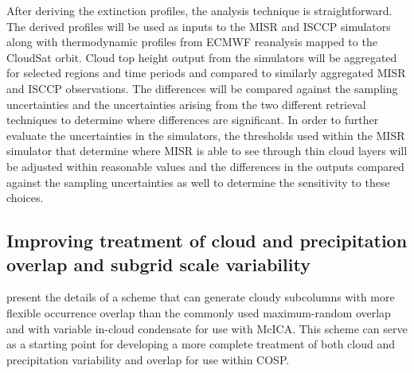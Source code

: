 \documentclass[letter]{article}
\begin{document}
After deriving the extinction profiles, the analysis technique is straightforward. The derived profiles will be used as inputs to the MISR and ISCCP simulators along with thermodynamic profiles from ECMWF reanalysis mapped to the CloudSat orbit. Cloud top height output from the simulators will be aggregated for selected regions and time periods and compared to similarly aggregated MISR and ISCCP observations. The differences will be compared against the sampling uncertainties and the uncertainties arising from the two different retrieval techniques to determine where differences are significant. In order to further evaluate the uncertainties in the simulators, the thresholds used within the MISR simulator that determine where MISR is able to see through thin cloud layers will be adjusted within reasonable values and the differences in the outputs compared against the sampling uncertainties as well to determine the sensitivity to these choices.


\subsection{Improving treatment of cloud and precipitation overlap and subgrid scale variability}
\cite{raisanen_et_al_2004} present the details of a scheme that can generate cloudy subcolumns with more flexible occurrence overlap than the commonly used maximum-random overlap and with variable in-cloud condensate for use with McICA. This scheme can serve as a starting point for developing a more complete treatment of both cloud and precipitation variability and overlap for use within COSP. %
\end{document}
